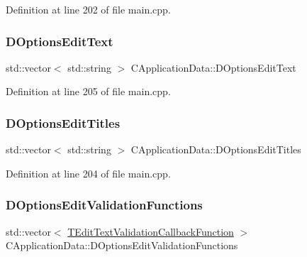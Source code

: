 Definition at line 202 of file main.\+cpp.

\hypertarget{classCApplicationData_a7044dc34cbd9d6776e8ef79eb12b5ce4}{}\label{classCApplicationData_a7044dc34cbd9d6776e8ef79eb12b5ce4} 
\subsubsection{\texorpdfstring{D\+Options\+Edit\+Text}{DOptionsEditText}}
{\footnotesize\ttfamily std\+::vector$<$ std\+::string $>$ C\+Application\+Data\+::\+D\+Options\+Edit\+Text\hspace{0.3cm}{\ttfamily [protected]}}



Definition at line 205 of file main.\+cpp.

\hypertarget{classCApplicationData_a7a322ef6b8c1db3e995c6b493230fd05}{}\label{classCApplicationData_a7a322ef6b8c1db3e995c6b493230fd05} 
\subsubsection{\texorpdfstring{D\+Options\+Edit\+Titles}{DOptionsEditTitles}}
{\footnotesize\ttfamily std\+::vector$<$ std\+::string $>$ C\+Application\+Data\+::\+D\+Options\+Edit\+Titles\hspace{0.3cm}{\ttfamily [protected]}}



Definition at line 204 of file main.\+cpp.

\hypertarget{classCApplicationData_ab76fa444142de66fdb058f390e01112c}{}\label{classCApplicationData_ab76fa444142de66fdb058f390e01112c} 
\subsubsection{\texorpdfstring{D\+Options\+Edit\+Validation\+Functions}{DOptionsEditValidationFunctions}}
{\footnotesize\ttfamily std\+::vector$<$ \hyperlink{main_8cpp_a1f079840d4510b96faa423932bed3af0}{T\+Edit\+Text\+Validation\+Callback\+Function} $>$ C\+Application\+Data\+::\+D\+Options\+Edit\+Validation\+Functions\hspace{0.3cm}{\ttfamily [protected]}}



